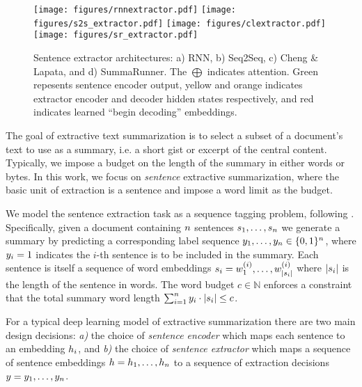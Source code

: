 \begin{figure*}
  \center
  \texttt{[image: figures/rnnextractor.pdf]}
  \texttt{[image: figures/s2s\_extractor.pdf]}
  \texttt{[image: figures/clextractor.pdf]}
  \texttt{[image: figures/sr\_extractor.pdf]}
  \caption{Sentence extractor architectures: a) RNN, b) Seq2Seq,
  c) Cheng \& Lapata, and d) SummaRunner. The $\bigoplus$ indicates 
  attention. Green repesents sentence encoder output, yellow and orange
  indicates
  extractor encoder and decoder hidden states respectively, and red indicates
  learned ``begin decoding'' embeddings. }
  \label{fig:extractors}
\end{figure*}




The goal of extractive text summarization is to select a subset of a 
document's text to use as a summary, i.e. a short gist or excerpt of the 
central content.
Typically, we impose a budget on the length of the summary in either 
words or bytes. In this work, we focus on \textit{sentence} extractive 
summarization, 
where the basic unit of extraction is a sentence and impose a word limit as 
the budget.

We model the sentence extraction task as a sequence tagging problem, 
following \cite{}. 
Specifically, given a document containing $n$ sentences 
$\sent_1, \ldots, \sent_{\docSize}$ we generate a summary by predicting a 
corresponding label sequence $\slabel_1, \ldots, \slabel_{\docSize} 
\in \{0, 1\}^{\docSize}$, where $\slabel_i = 1$ 
indicates the $i$-th sentence is to be included in the summary.
Each sentence is itself a sequence of word embeddings 
$\sent[i] = \wordEmb[1]^{(i)}, \ldots, \wordEmb[{|\sent[i]|}]^{(i)}$ where
$|\sent[i]|$ is the length of the sentence in words.
The word budget $c \in \mathbb{N}$ 
enforces a constraint that the total summary word length 
$\sum_{i=1}^\docSize \slabel_i \cdot |\sent[i]| \le c$.








For a typical deep learning model of extractive 
summarization there are two main design decisions:
\textit{a)}  the choice of \textit{sentence encoder} 
which maps each sentence \sent[i] 
to an embedding $\sentEmb[i]$, 
and 
\textit{b)} the choice of \textit{sentence extractor} 
which maps a sequence of sentence embeddings 
$\sentEmb = \sentEmb[1],\ldots, \sentEmb[\docSize]$  
to a sequence of extraction
decisions $\slabel = \slabel_1,\ldots,\slabel_{\docSize}$.









